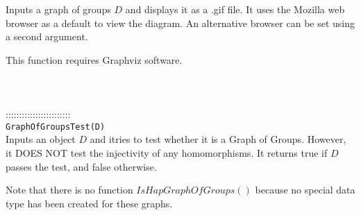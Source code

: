 \documentclass[a4paper,11pt]{report}
\begin{document}
{ Inputs a graph of groups $D$ and displays it as a .gif file. It uses the Mozilla web browser as a default
to view the diagram. An alternative browser can be set using a second
argument. 

 This function requires Graphviz software. \\
 \\
 \\
 \\
 ::::::::::::::::::::::::\\
 \texttt{GraphOfGroupsTest(D) }\\
 

 Inputs an object $D$ and itries to test whether it is a Graph of Groups. However, it DOES NOT test
the injectivity of any homomorphisms. It returns true if $D$ passes the test, and false otherwise. 

 Note that there is no function $IsHapGraphOfGroups()$ because no special data type has been created for these graphs. \\
 \\
 \\
 }

 
\end{document}
